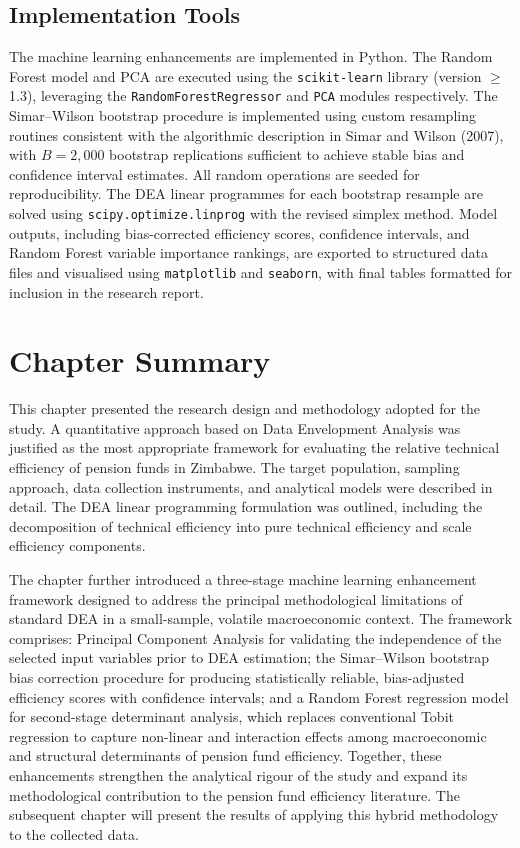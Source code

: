 \documentclass[12pt,a4paper]{article}
\begin{document}
\subsection{Implementation Tools}

The machine learning enhancements are implemented in Python. The Random Forest model and PCA are executed using the \texttt{scikit-learn} library (version $\geq$1.3), leveraging the \texttt{RandomForestRegressor} and \texttt{PCA} modules respectively. The Simar--Wilson bootstrap procedure is implemented using custom resampling routines consistent with the algorithmic description in Simar and Wilson (2007), with $B = 2{,}000$ bootstrap replications sufficient to achieve stable bias and confidence interval estimates. All random operations are seeded for reproducibility. The DEA linear programmes for each bootstrap resample are solved using \texttt{scipy.optimize.linprog} with the revised simplex method. Model outputs, including bias-corrected efficiency scores, confidence intervals, and Random Forest variable importance rankings, are exported to structured data files and visualised using \texttt{matplotlib} and \texttt{seaborn}, with final tables formatted for inclusion in the research report.

\section{Chapter Summary}

This chapter presented the research design and methodology adopted for the study. A quantitative approach based on Data Envelopment Analysis was justified as the most appropriate framework for evaluating the relative technical efficiency of pension funds in Zimbabwe. The target population, sampling approach, data collection instruments, and analytical models were described in detail. The DEA linear programming formulation was outlined, including the decomposition of technical efficiency into pure technical efficiency and scale efficiency components.

The chapter further introduced a three-stage machine learning enhancement framework designed to address the principal methodological limitations of standard DEA in a small-sample, volatile macroeconomic context. The framework comprises: Principal Component Analysis for validating the independence of the selected input variables prior to DEA estimation; the Simar--Wilson bootstrap bias correction procedure for producing statistically reliable, bias-adjusted efficiency scores with confidence intervals; and a Random Forest regression model for second-stage determinant analysis, which replaces conventional Tobit regression to capture non-linear and interaction effects among macroeconomic and structural determinants of pension fund efficiency. Together, these enhancements strengthen the analytical rigour of the study and expand its methodological contribution to the pension fund efficiency literature. The subsequent chapter will present the results of applying this hybrid methodology to the collected data.
\end{document}
